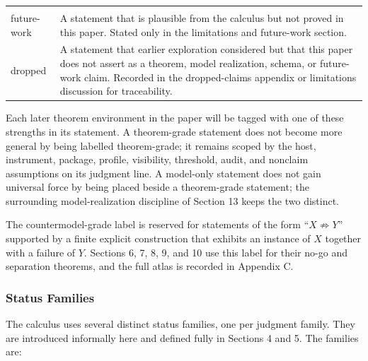 \documentclass[11pt]{article}
\theoremstyle{definition}
\begin{document}
\begin{longtable}[]{@{}ll@{}}
\begin{minipage}[t]{0.47\columnwidth}
\end{minipage}\tabularnewline
\begin{minipage}[t]{0.47\columnwidth}\raggedright
future-work\strut
\end{minipage} & \begin{minipage}[t]{0.47\columnwidth}\raggedright
A statement that is plausible from the calculus but not proved in this paper. Stated only in the limitations and future-work section.\strut
\end{minipage}\tabularnewline
\begin{minipage}[t]{0.47\columnwidth}\raggedright
dropped\strut
\end{minipage} & \begin{minipage}[t]{0.47\columnwidth}\raggedright
A statement that earlier exploration considered but that this paper does not assert as a theorem, model realization, schema, or future-work claim. Recorded in the dropped-claims appendix or limitations discussion for traceability.\strut
\end{minipage}\tabularnewline
\bottomrule
\end{longtable}

Each later theorem environment in the paper will be tagged with one of these strengths in its statement. A theorem-grade statement does not become more general by being labelled theorem-grade; it remains scoped by the host, instrument, package, profile, visibility, threshold, audit, and nonclaim assumptions on its judgment line. A model-only statement does not gain universal force by being placed beside a theorem-grade statement; the surrounding model-realization discipline of Section 13 keeps the two distinct.

The countermodel-grade label is reserved for statements of the form ``\(X\not\Rightarrow Y\)'' supported by a finite explicit construction that exhibits an instance of \(X\) together with a failure of \(Y\). Sections 6, 7, 8, 9, and 10 use this label for their no-go and separation theorems, and the full atlas is recorded in Appendix C.

\subsubsection{Status Families}

The calculus uses several distinct status families, one per judgment family. They are introduced informally here and defined fully in Sections 4 and 5. The families are:
\end{document}
